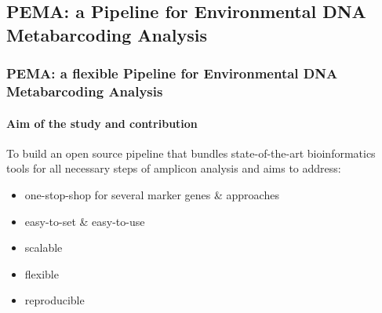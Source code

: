 \documentclass{beamer}
\begin{document}

   \begin{darkframes}
      \subsection{PEMA: a Pipeline for Environmental DNA Metabarcoding Analysis}
   \end{darkframes}
   
   \begin{darkframes}
      \begin{frame}
         \frametitle{PEMA: a flexible Pipeline for Environmental DNA Metabarcoding Analysis}
         \framesubtitle{Aim of the study and contribution}

         \bigskip

         To build an open source
         pipeline that bundles state-of-the-art bioinformatics tools for all necessary steps of
         amplicon analysis and aims to address:
         \begin{itemize}
            \item one-stop-shop for several marker genes \& approaches
            \item easy-to-set \& easy-to-use 
            \item scalable
            \item flexible
            \item reproducible
         \end{itemize}

      \end{frame}

   \end{darkframes}
\end{document}
